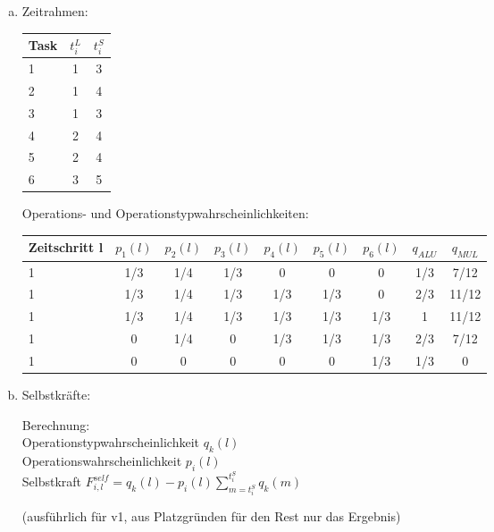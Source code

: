 \documentclass[a4paper]{scrartcl}
\begin{document}
\begin{enumerate}[(a)]
	\item Zeitrahmen:
	
	\begin{tabular}{|l||c|c|}
		\hline 
		Task& $t_i^L$ & $t_i^S$ \\ 
		\hline 
		1& 1 & 3 \\ 
		\hline 
		2& 1 & 4 \\ 
		\hline 
		3& 1 & 3 \\ 
		\hline 
		4& 2 & 4 \\ 
		\hline 
		5& 2 & 4 \\ 
		\hline 
		6& 3 & 5 \\ 
		\hline 
	\end{tabular} 
	
	Operations- und Operationstypwahrscheinlichkeiten:
	
	\begin{tabular}{|l||c|c|c|c|c|c|c|c|}
		\hline 
		Zeitschritt l& $p_1(l)$ & $p_2(l)$ & $p_3(l)$ & $p_4(l)$ & $p_5(l)$ & $p_6(l)$ & $q_{ALU}$ & $q_{MUL}$ \\ 
		\hline 
		1& 1/3 & 1/4 & 1/3 & 0   & 0   & 0   & 1/3 & 7/12 \\ 
		\hline 
		1& 1/3 & 1/4 & 1/3 & 1/3 & 1/3 & 0   & 2/3 & 11/12 \\ 
		\hline 
		1& 1/3 & 1/4 & 1/3 & 1/3 & 1/3 & 1/3 & 1   & 11/12 \\ 
		\hline 
		1& 0   & 1/4 & 0   & 1/3 & 1/3 & 1/3 & 2/3 & 7/12 \\ 
		\hline 
		1& 0   & 0   & 0   & 0   & 0   & 1/3 & 1/3 & 0 \\ 
		\hline 
	\end{tabular} 
	
	\item Selbstkräfte:
	
	Berechnung:\\
	Operationstypwahrscheinlichkeit $q_k(l)$\\
	Operationswahrscheinlichkeit $p_i(l)$\\
	Selbstkraft $F_{i,l}^{self} = q_k(l) - p_i(l) \sum_{m=t_i^S}^{t_i^S}q_k(m)$
	
	
	(ausführlich für v1, aus Platzgründen für den Rest nur das Ergebnis)
	

\end{enumerate}
\end{document}
